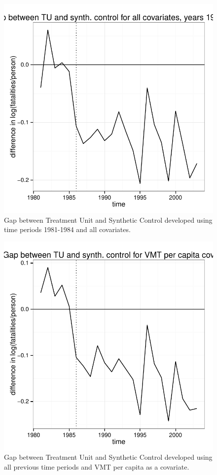 \documentclass[letterpaper, 12pt]{article}
\begin{document}
\begin{figure}[htbp]
\begin{center}
\includegraphics{img-gap-full1984.pdf}
\caption{Gap between Treatment Unit and Synthetic Control developed using time periods 1981-1984 and all covariates.}
\label{fig:c12}
\end{center}
\end{figure}

\begin{figure}[htbp]
\begin{center}
\includegraphics{img-gap-vmt.pdf}
\caption{Gap between Treatment Unit and Synthetic Control developed using all previous time periods and VMT per capita as a covariate.}
\label{fig:c13}
\end{center}
\end{figure}
\end{document}

